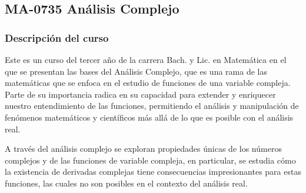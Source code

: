 \newpage
\subsection*{MA-0735 Análisis Complejo}

\hypertarget{MA0735}{}
\begin{refsection}
\begin{table}[H]
\end{table}



\subsubsection*{Descripción del curso}

Este es un curso del tercer año de la carrera Bach. y Lic. en Matemática en el que se presentan las bases del Análisis Complejo, que es una rama de las matemáticas que se enfoca en el estudio de funciones de una variable compleja. Parte de su importancia radica en su capacidad para extender y enriquecer nuestro entendimiento de las funciones, permitiendo el análisis y manipulación de fenómenos matemáticos y científicos más allá de lo que es posible con el análisis real. 

A través del análisis complejo se exploran propiedades únicas de los números complejos y de las funciones de variable compleja, en particular, se estudia cómo la existencia de derivadas complejas tiene consecuencias impresionantes para estas funciones, las cuales no son posibles en el contexto del análisis real.


\end{refsection}
